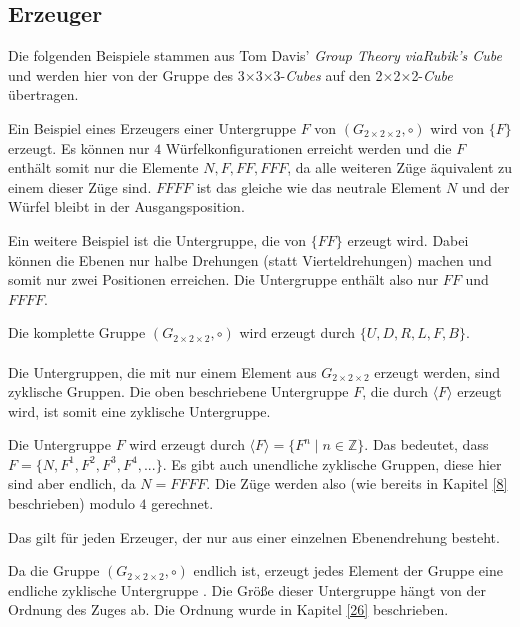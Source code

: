 \documentclass[12pt,a4paper, usenames, dvipsnames]{article}
\newcommand{\Gtwo}{\ensuremath{G_{2\times 2\times 2}}}
\newcommand{\Ttwo}{2$\times$2$\times$2-}
\newcommand{\Tthree}{3$\times$3$\times$3-}
\begin{document}
%
%
%
%
%
%
%
%
%
%
%
%
%
%
%
%
%
%
%
%

\subsection*{Erzeuger}

Die folgenden Beispiele stammen aus Tom Davis' \textit{Group Theory viaRubik's Cube} \cite{TD} und werden hier von der Gruppe des \Tthree \textit{Cubes} auf den \Ttwo \textit{Cube} übertragen.


Ein Beispiel eines Erzeugers einer Untergruppe $F$ von $(\Gtwo, \circ)$ wird von $\{ F \}$ erzeugt. Es können nur $4$ Würfelkonfigurationen erreicht werden und die $F$ enthält somit nur die Elemente ${N, F, FF, FFF}$, da alle weiteren Züge äquivalent zu einem dieser Züge sind. $FFFF$ ist das gleiche wie das neutrale Element $N$ und der Würfel bleibt in der Ausgangsposition.


Ein weitere Beispiel ist die Untergruppe, die von $\{FF\}$ erzeugt wird. Dabei können die Ebenen nur halbe Drehungen (statt Vierteldrehungen) machen und somit nur zwei Positionen erreichen. Die Untergruppe enthält also nur $FF$ und $FFFF$.


Die komplette Gruppe $(\Gtwo, \circ)$ wird erzeugt durch $\{U, D, R, L, F, B\}$.
\\
\\
Die Untergruppen, die mit nur einem Element aus $\Gtwo$ erzeugt werden, sind zyklische Gruppen. Die oben beschriebene Untergruppe $F$, die durch $\langle F \rangle$ erzeugt wird, ist somit eine zyklische Untergruppe.

Die Untergruppe $F$ wird erzeugt durch $\langle F \rangle = \{ F^n \mid n \in \mathbb{Z}\}$. Das bedeutet, dass $F = \{N, F^1, F^2, F^3, F^4, ...\}$. Es gibt auch unendliche zyklische Gruppen, diese hier sind aber endlich, da $N = FFFF$. Die Züge werden also (wie bereits in Kapitel \ref{8} beschrieben) modulo $4$ gerechnet.

Das gilt für jeden Erzeuger, der nur aus einer einzelnen Ebenendrehung besteht.


Da die Gruppe $(\Gtwo, \circ)$ endlich ist, erzeugt jedes Element der Gruppe eine endliche zyklische Untergruppe \cite{TD}. Die Größe dieser Untergruppe hängt von der Ordnung des Zuges ab. Die Ordnung wurde in Kapitel \ref{26} beschrieben.
\end{document}

